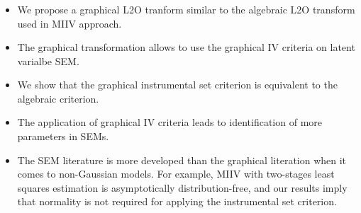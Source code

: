 \documentclass{beamer}
\begin{document}
\begin{frame}
	\frametitle{}
	\begin{itemize}
		\item We propose a graphical L2O tranform similar to the algebraic L2O transform used in MIIV approach.
		\item The graphical transformation allows to use the graphical IV criteria on latent varialbe SEM.
		\item We show that the graphical instrumental set criterion is equivalent to the algebraic criterion.
		\item The application of graphical IV criteria leads to identification of more parameters in SEMs.
		\item The SEM literature is more developed than the graphical
			literation when it comes to non-Gaussian models. For
			example, MIIV with two-stages least squares estimation
			is asymptotically distribution-free, and our results
			imply that normality is not required for applying the
			instrumental set criterion.
	\end{itemize}
\end{frame}
\end{document}
